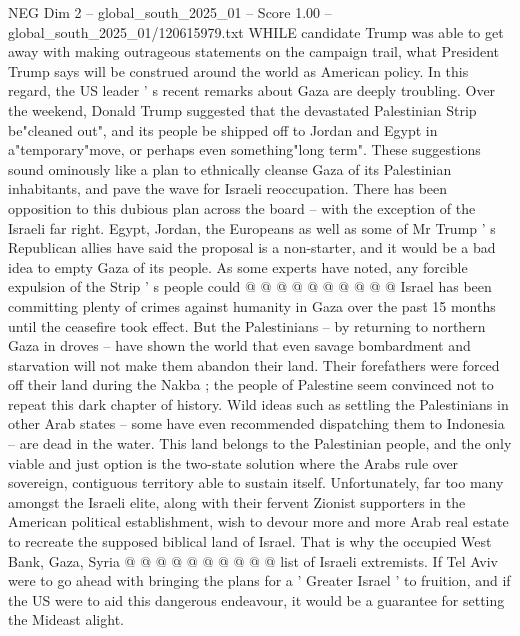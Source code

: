 \begin{textsample}{NEG Dim 2 – global\_south\_2025\_01 – Score 1.00 – global\_south\_2025\_01/120615979.txt}  \label{ex:f2_neg_122}
WHILE candidate Trump was able to get away with making outrageous statements on the campaign trail, what President Trump says will be construed around the world as American policy.
In this regard, the US leader ' s recent remarks about Gaza are deeply troubling.
Over the weekend, Donald Trump suggested that the devastated Palestinian Strip be"cleaned out", and its people be shipped off to Jordan and Egypt in a"temporary"move, or perhaps even something"long term".
These suggestions sound ominously like a plan to ethnically cleanse Gaza of its Palestinian inhabitants, and pave the wave for Israeli reoccupation.
There has been opposition to this dubious plan across the board -- with the exception of the Israeli far right.
Egypt, Jordan, the Europeans as well as some of Mr Trump ' s Republican allies have said the proposal is a non-starter, and it would be a bad idea to empty Gaza of its people.
As some experts have noted, any forcible expulsion of the Strip ' s people could @ @ @ @ @ @ @ @ @ @ Israel has been committing plenty of crimes against humanity in Gaza over the past 15 months until the ceasefire took effect.
But the Palestinians -- by returning to northern Gaza in droves -- have shown the world that even savage bombardment and starvation will not make them abandon their land.
Their forefathers were forced off their land during the Nakba ; the people of Palestine seem convinced not to repeat this dark chapter of history.
Wild ideas such as settling the Palestinians in other Arab states -- some have even recommended dispatching them to Indonesia -- are dead in the water.
This land belongs to the Palestinian people, and the only viable and just option is the two-state solution where the Arabs rule over sovereign, contiguous territory able to sustain itself.
Unfortunately, far too many amongst the Israeli elite, along with their fervent Zionist supporters in the American political establishment, wish to devour more and more Arab real estate to recreate the supposed biblical land of Israel.
That is why the occupied West Bank, Gaza, Syria @ @ @ @ @ @ @ @ @ @ list of Israeli extremists.
If Tel Aviv were to go ahead with bringing the plans for a ' Greater Israel ' to fruition, and if the US were to aid this dangerous endeavour, it would be a guarantee for setting the Mideast alight.

\end{textsample}
